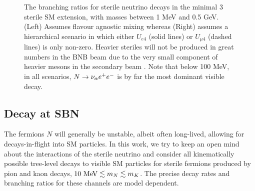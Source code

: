 \documentclass[11pt, a4paper]{article}
\newcommand{\reffig}[1]{Fig.~\ref{#1}}
\def\ster{\ensuremath N}
\begin{document}
\begin{figure}[t]
\caption{\label{fig:branchingratios}The branching ratios for sterile neutrino
decays in the minimal 3 sterile SM extension, with masses between 1 MeV and 0.5
GeV. (Left) Assumes flavour agnostic mixing whereas (Right) assumes a
hierarchical scenario in which either $U_{e4}$ (solid lines) or $U_{\mu 4}$
(dashed lines) is only non-zero. Heavier steriles will not be produced in great
numbers in the BNB beam due to the very small component of heavier mesons in
the secondary beam \cite{AguilarArevalo:2008yp}. Note that below 100 MeV, in
all scenarios, $\ster \rightarrow \nu_\alpha e^+ e^-$ is by far the most
dominant visible decay.}

\end{figure}
%

\subsection{Decay at SBN}

The fermions $N$ will generally be unstable, albeit often long-lived, allowing
for decays-in-flight into SM particles. In this work, we try to keep an open
mind about the interactions of the sterile neutrino and consider all
kinematically possible tree-level decays to visible SM particles for sterile
fermions produced by pion and kaon decays, $10~\text{MeV}\lesssim m_{\ster}
\lesssim m_K$. The precise decay rates and branching ratios for these channels
are model dependent. 
%

%
%
%
%
\end{document}
